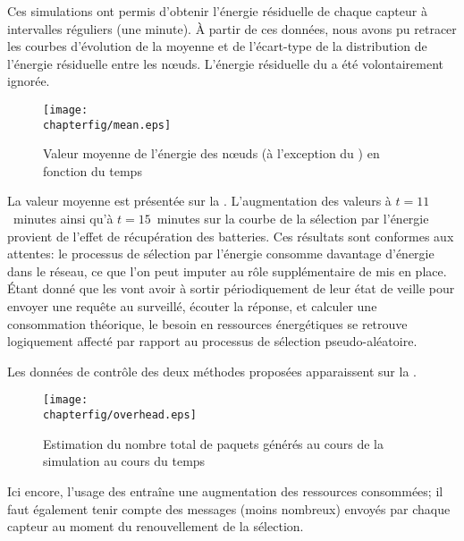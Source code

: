 Ces simulations ont permis d'obtenir l'énergie résiduelle de chaque capteur à intervalles réguliers (une minute).
À partir de ces données, nous avons pu retracer les courbes d'évolution de la moyenne et de l'écart-type de la distribution de l'énergie résiduelle entre les nœuds.
L'énergie résiduelle du \ch a été volontairement ignorée.
\begin{figure}[h!]
    \centering
    \texttt{[image: \\chapterfig/mean.eps]}
    \caption{Valeur moyenne de l'énergie des nœuds (à l'exception du \ch) en fonction du temps}\label{se:fig:mean}
\end{figure}
La valeur moyenne est présentée sur la .
L'augmentation des valeurs à $t=11$~minutes ainsi qu'à $t=15$~minutes sur la courbe de la sélection par l'énergie provient de l'effet de récupération des batteries.
Ces résultats sont conformes aux attentes: le processus de sélection par l'énergie consomme davantage d'énergie dans le réseau, ce que l'on peut imputer au rôle supplémentaire de \vn mis en place.
Étant donné que les \vns vont avoir à sortir périodiquement de leur état de veille pour envoyer une requête au \cn surveillé, écouter la réponse, et calculer une consommation théorique, le besoin en ressources énergétiques se retrouve logiquement affecté par rapport au processus de sélection pseudo-aléatoire.

Les données de contrôle des deux méthodes proposées apparaissent sur la .
\begin{figure}[h!]
    \centering
    \texttt{[image: \\chapterfig/overhead.eps]}
    \caption{Estimation du nombre total de paquets générés au cours de la simulation au cours du temps}\label{se:fig:overhead}
\end{figure}
Ici encore, l'usage des \vns entraîne une augmentation des ressources consommées; il faut également tenir compte des messages (moins nombreux) envoyés par chaque capteur au moment du renouvellement de la sélection.

